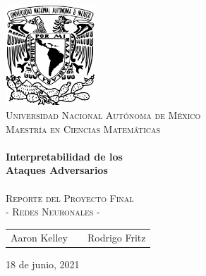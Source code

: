\begin{titlepage}
    \begin{center}
    \includegraphics[width=0.25\textwidth]{resources/unam_escudo.png}~\\[2cm]
    \textsc{\huge Universidad Nacional Autónoma de México}\\[0.5cm]  
    \textsc{\LARGE Maestría en Ciencias Matemáticas}\\[2cm]
    
    \HRule \\
    {\Huge \bfseries Interpretabilidad de los \\[1cm] Ataques Adversarios} \\[0.3cm] 
    \HRule \\[0.5cm]
    
    \textsc{\LARGE Reporte del Proyecto Final}\\[0.4cm]
    \textsc{\LARGE - Redes Neuronales - }\\[3cm]
    

    {\Large
    \begin{tabular}{ccc}
        Aaron Kelley & \hspace{1.5in} & Rodrigo Fritz
    \end{tabular}
    }
    \vfill

    {\Large 18 de junio, 2021}
    
    \end{center} 
\end{titlepage}